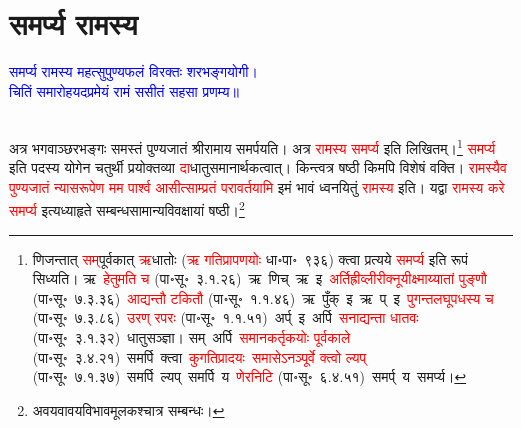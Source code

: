 \section[समर्प्य रामस्य]{समर्प्य रामस्य}
\centering\textcolor{blue}{समर्प्य रामस्य महत्सुपुण्यफलं विरक्तः शरभङ्गयोगी।\nopagebreak\\
चितिं समारोहयदप्रमेयं रामं ससीतं सहसा प्रणम्य॥}\nopagebreak\\
\\
\begin{sloppypar}\justifying\noindent\hspace{10mm} अत्र भगवाञ्छरभङ्गः समस्तं पुण्य\-जातं श्रीरामाय समर्पयति। अत्र \textcolor{red}{रामस्य समर्प्य} इति लिखितम्।\footnote{णिजन्तात् \textcolor{red}{सम्‌}\-पूर्वकात् \textcolor{red}{ऋ}\-धातोः (\textcolor{red}{ऋ गतिप्रापणयोः} धा॰पा॰~९३६) क्त्वा प्रत्यये \textcolor{red}{समर्प्य} इति रूपं सिध्यति। ऋ~\arrow \textcolor{red}{हेतुमति च} (पा॰सू॰~३.१.२६)~\arrow ऋ~णिच्~\arrow ऋ~इ~\arrow \textcolor{red}{अर्ति\-ह्री\-व्ली\-री\-क्नूयी\-क्ष्माय्यातां पुङ्णौ} (पा॰सू॰~७.३.३६)~\arrow \textcolor{red}{आद्यन्तौ टकितौ} (पा॰सू॰~१.१.४६)~\arrow ऋ~पुँक्~इ~\arrow ऋ~प्~इ~\arrow \textcolor{red}{पुगन्त\-लघूपधस्य च} (पा॰सू॰~७.३.८६)~\arrow \textcolor{red}{उरण् रपरः} (पा॰सू॰~१.१.५१)~\arrow अर्प्~इ~\arrow अर्पि~\arrow \textcolor{red}{सनाद्यन्ता धातवः} (पा॰सू॰~३.१.३२)~\arrow धातु\-सञ्ज्ञा। सम्~अर्पि~\arrow \textcolor{red}{समानकर्तृकयोः पूर्वकाले} (पा॰सू॰~३.४.२१)~\arrow समर्पि~क्त्वा~\arrow \textcolor{red}{कुगतिप्रादयः}~\arrow \textcolor{red}{समासेऽनञ्पूर्वे क्त्वो ल्यप्‌} (पा॰सू॰~७.१.३७)~\arrow समर्पि~ल्यप्~\arrow समर्पि~य~\arrow \textcolor{red}{णेरनिटि} (पा॰सू॰~६.४.५१)~\arrow समर्प्~य~\arrow समर्प्य।} \textcolor{red}{समर्प्य} इति पदस्य योगेन चतुर्थी प्रयोक्तव्या \textcolor{red}{दा}\-धातु\-समानार्थकत्वात्। किन्त्वत्र षष्ठी किमपि विशेषं वक्ति। \textcolor{red}{रामस्यैव पुण्य\-जातं न्यास\-रूपेण मम पार्श्व आसीत्साम्प्रतं परावर्तयामि} इमं भावं ध्वनयितुं \textcolor{red}{रामस्य} इति। यद्वा \textcolor{red}{रामस्य करे समर्प्य} इत्यध्याहृते सम्बन्ध\-सामान्य\-विवक्षायां षष्ठी।\footnote{अवयवावयवि\-भाव\-मूलकश्चात्र सम्बन्धः।}\end{sloppypar}
